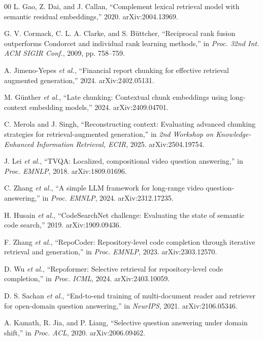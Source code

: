 \documentclass[conference]{IEEEtran}
\begin{document}
\begin{thebibliography}{00}
 L. Gao, Z. Dai, and J. Callan, ``Complement lexical retrieval model with semantic residual embeddings,'' 2020. arXiv:2004.13969.

 G. V. Cormack, C. L. A. Clarke, and S. B\"{u}ttcher, ``Reciprocal rank fusion outperforms Condorcet and individual rank learning methods,'' in \emph{Proc. 32nd Int. ACM SIGIR Conf.}, 2009, pp. 758--759.

 A. Jimeno-Yepes \emph{et al.}, ``Financial report chunking for effective retrieval augmented generation,'' 2024. arXiv:2402.05131.

 M. G\"{u}nther \emph{et al.}, ``Late chunking: Contextual chunk embeddings using long-context embedding models,'' 2024. arXiv:2409.04701.

 C. Merola and J. Singh, ``Reconstructing context: Evaluating advanced chunking strategies for retrieval-augmented generation,'' in \emph{2nd Workshop on Knowledge-Enhanced Information Retrieval, ECIR}, 2025. arXiv:2504.19754.

 J. Lei \emph{et al.}, ``TVQA: Localized, compositional video question answering,'' in \emph{Proc. EMNLP}, 2018. arXiv:1809.01696.

 C. Zhang \emph{et al.}, ``A simple LLM framework for long-range video question-answering,'' in \emph{Proc. EMNLP}, 2024. arXiv:2312.17235.

 H. Husain \emph{et al.}, ``CodeSearchNet challenge: Evaluating the state of semantic code search,'' 2019. arXiv:1909.09436.

 F. Zhang \emph{et al.}, ``RepoCoder: Repository-level code completion through iterative retrieval and generation,'' in \emph{Proc. EMNLP}, 2023. arXiv:2303.12570.

 D. Wu \emph{et al.}, ``Repoformer: Selective retrieval for repository-level code completion,'' in \emph{Proc. ICML}, 2024. arXiv:2403.10059.

 D. S. Sachan \emph{et al.}, ``End-to-end training of multi-document reader and retriever for open-domain question answering,'' in \emph{NeurIPS}, 2021. arXiv:2106.05346.

 A. Kamath, R. Jia, and P. Liang, ``Selective question answering under domain shift,'' in \emph{Proc. ACL}, 2020. arXiv:2006.09462.


\end{thebibliography}
\end{document}
